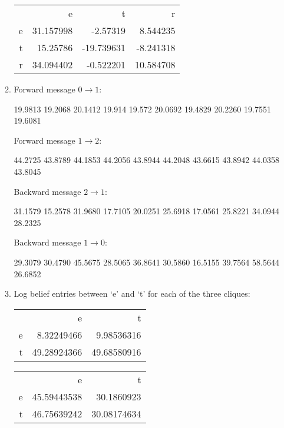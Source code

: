\documentclass[12pt]{article}
\begin{document}
\begin{enumerate}
\begin{enumerate}
\begin{center}
\begin{tabular}{rrrr}
& e & t & r \\
e & 31.157998 & -2.57319 & 8.544235 \\
t & 15.25786 & -19.739631 & -8.241318 \\
r & 34.094402 & -0.522201 & 10.584708
\end{tabular}
\end{center}

\item %
Forward message $0 \to 1$:
\begin{center}
19.9813  19.2068  20.1412  19.914  19.572 20.0692  19.4829   20.2260  19.7551  19.6081
\end{center}

Forward message $1 \to 2$:
\begin{center}
44.2725 43.8789 44.1853 44.2056  43.8944 44.2048 43.6615 43.8942 44.0358 43.8045
\end{center}

Backward message $2 \to 1$:
\begin{center}
31.1579  15.2578  31.9680  17.7105   20.0251 25.6918  17.0561  25.8221  34.0944  28.2325
\end{center}
  
Backward message $1 \to 0$:
\begin{center}
29.3079  30.4790  45.5675  28.5065  36.8641 30.5860  16.5155  39.7564  58.5644  26.6852
\end{center}

\item %
Log belief entries between `e' and `t' for each of the three cliques:

\begin{center}
\begin{tabular}{rrr}
& e & t \\
e & 8.32249466 & 9.98536316 \\
t & 49.28924366 & 49.68580916
\end{tabular}
\end{center}

\begin{center}
\begin{tabular}{rrr}
& e & t \\
e & 45.59443538 & 30.1860923 \\
t & 46.75639242 & 30.08174634
\end{tabular}
\end{center}
 

\end{enumerate}
\end{enumerate}
\end{document}
